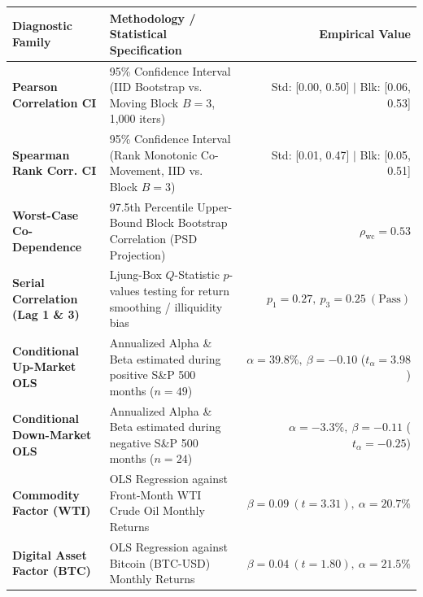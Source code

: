 \documentclass[10pt,a4paper]{article}
\begin{document}
\vspace{0.45em}

\begin{tcolorbox}[colback=white, colframe=primary, title=\textbf{\small\strut Appendix A: Extended Statistical, Bootstrap \& Factor Diagnostics}, fonttitle=\sffamily\bfseries\small, arc=5pt, boxrule=0.8pt, toptitle=4pt, bottomtitle=4pt, left=6pt, right=6pt, top=3.5pt, bottom=3.5pt, colbacktitle=primary]
\renewcommand{\arraystretch}{1.22}
\scriptsize
\begin{tabularx}{\textwidth}{l X r}
\toprule
\textbf{\textcolor{primary}{Diagnostic Family}} & \textbf{\textcolor{primary}{Methodology / Statistical Specification}} & \textbf{\textcolor{primary}{Empirical Value}} \\
\midrule
\textbf{Pearson Correlation CI} & 95\% Confidence Interval (IID Bootstrap vs. Moving Block $B=3$, 1,000 iters) & Std: [0.00, 0.50] $\vert$ Blk: [0.06, 0.53] \\
\rowcolor{cardbg} \textbf{Spearman Rank Corr. CI} & 95\% Confidence Interval (Rank Monotonic Co-Movement, IID vs. Block $B=3$) & Std: [0.01, 0.47] $\vert$ Blk: [0.05, 0.51] \\
\textbf{Worst-Case Co-Dependence} & 97.5th Percentile Upper-Bound Block Bootstrap Correlation (PSD Projection) & $\rho_{\text{wc}} = 0.53$ \\
\rowcolor{cardbg} \textbf{Serial Correlation (Lag 1 \& 3)} & Ljung-Box $Q$-Statistic $p$-values testing for return smoothing / illiquidity bias & $p_1=0.27,\ p_3=0.25\ (\text{Pass})$ \\
\textbf{Conditional Up-Market OLS} & Annualized Alpha \& Beta estimated during positive S\&P 500 months ($n=49$) & $\alpha=39.8\%,\ \beta=-0.10$ ($t_\alpha=3.98$) \\
\rowcolor{cardbg} \textbf{Conditional Down-Market OLS} & Annualized Alpha \& Beta estimated during negative S\&P 500 months ($n=24$) & $\alpha=-3.3\%,\ \beta=-0.11$ ($t_\alpha=-0.25$) \\
\textbf{Commodity Factor (WTI)} & OLS Regression against Front-Month WTI Crude Oil Monthly Returns & $\beta=0.09\ (t=3.31),\ \alpha=20.7\%$ \\
\rowcolor{cardbg} \textbf{Digital Asset Factor (BTC)} & OLS Regression against Bitcoin (BTC-USD) Monthly Returns & $\beta=0.04\ (t=1.80),\ \alpha=21.5\%$ \\
\bottomrule
\end{tabularx}
\end{tcolorbox}
\end{document}

